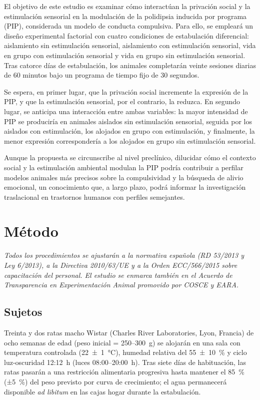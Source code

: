 \documentclass[12pt,a4paper]{article}
\begin{document}
\begin{multicols}{2}
El objetivo de este estudio es examinar cómo interactúan la privación social y la estimulación sensorial en la modulación de la polidipsia inducida por programa (PIP), considerada un modelo de conducta compulsiva. Para ello, se empleará un diseño experimental factorial con cuatro condiciones de estabulación diferencial: aislamiento sin estimulación sensorial, aislamiento con estimulación sensorial, vida en grupo con estimulación sensorial y vida en grupo sin estimulación sensorial. Tras catorce días de estabulación, los animales completarán veinte sesiones diarias de 60 minutos bajo un programa de tiempo fijo de 30 segundos.

Se espera, en primer lugar, que la privación social incremente la expresión de la PIP, y que la estimulación sensorial, por el contrario, la reduzca. En segundo lugar, se anticipa una interacción entre ambas variables: la mayor intensidad de PIP se produciría en animales aislados sin estimulación sensorial, seguida por los aislados con estimulación, los alojados en grupo con estimulación, y finalmente, la menor expresión correspondería a los alojados en grupo sin estimulación sensorial.

Aunque la propuesta se circunscribe al nivel preclínico, dilucidar cómo el contexto social y la estimulación ambiental modulan la PIP podría contribuir a perfilar modelos animales más precisos sobre la compulsividad y la búsqueda de alivio emocional, un conocimiento que, a largo plazo, podrá informar la investigación traslacional en trastornos humanos con perfiles semejantes.


\section{Método}

\textit{Todos los procedimientos se ajustarán a la normativa española (RD 53/2013 y Ley 6/2013), a la Directiva 2010/63/UE y a la Orden ECC/566/2015 sobre capacitación del personal. El estudio se enmarca también en el Acuerdo de Transparencia en Experimentación Animal promovido por COSCE y EARA.}

\subsection*{Sujetos}

Treinta y dos ratas macho Wistar (Charles River Laboratories, Lyon, Francia) de ocho semanas de edad (peso inicial = 250–300~g) se alojarán en una sala con temperatura controlada (22~±~1~°C), humedad relativa del 55~±~10~\% y ciclo luz-oscuridad 12:12~h (luces 08:00–20:00~h). Tras siete días de habituación, las ratas pasarán a una restricción alimentaria progresiva hasta mantener el 85~\% (±5~\%) del peso previsto por curva de crecimiento; el agua permanecerá disponible \textit{ad libitum} en las cajas hogar durante la estabulación.


\end{multicols}
\end{document}
